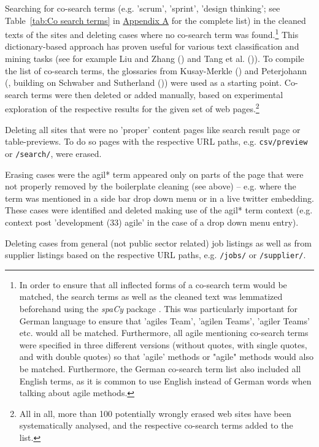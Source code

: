 \begin{compactitem}
\begin{compactitem}
    \item Searching for co-search terms (e.g. 'scrum', 'sprint', 'design thinking'; see Table~\ref{tab:Co search terms} in \hyperref[Appendix A]{Appendix A} for the complete list) in the cleaned texts of the sites and deleting cases where no co-search term was found.\footnote{In order to ensure that all inflected forms of a co-search term would be matched, the search terms as well as the cleaned text was lemmatized beforehand using the \textit{spaCy} package \parencite{honnibal-johnson:2015:EMNLP}. This was particularly important for German language to ensure that 'agiles Team', 'agilen Teams', 'agiler Teams' etc. would all be matched. Furthermore, all agile mentioning co-search terms were specified in three different versions (without quotes, with single quotes, and with double quotes) so that 'agile' methods or "agile" methods would also be matched. Furthermore, the German co-search term list also included all English terms, as it is common to use English instead of German words when talking about agile methods.} This dictionary-based approach has proven useful for various text classification and mining tasks (see for example Liu and Zhang (\cite*{Liu2012}) and  Tang et al. (\cite*{TANG2013})). To compile the list of co-search terms, the glossaries from Kusay-Merkle (\cite*{Kusay-Merkle2018}) and Peterjohann (\cite*{Peterjohann2020}, building on Schwaber  and  Sutherland (\cite*{Schwaber2020})) were used as a starting point. Co-search terms were then deleted or added manually, based on experimental exploration of the respective results for the given set of web pages.\footnote{All in all, more than 100 potentially wrongly erased web sites have been systematically analysed, and the respective co-search terms added to the list.} 
    \item Deleting all sites that were no 'proper' content pages like search result page or table-previews. To do so pages with the respective URL paths, e.g. \texttt{csv/preview} or \texttt{/search/}, were erased.
    \item Erasing cases were the agil* term appeared only on parts of the page that were not properly removed by the boilerplate cleaning (see above) – e.g. where the term was mentioned in a side bar drop down menu or in a live twitter embedding. These cases were identified and deleted making use of the agil* term context (e.g. context post 'development (33) agile' in the case of a drop down menu entry).
    \item Deleting cases from general (not public sector related) job listings as well as from supplier listings based on the respective URL paths, e.g. \texttt{/jobs/} or \texttt{/supplier/}.

\end{compactitem}
\end{compactitem}
